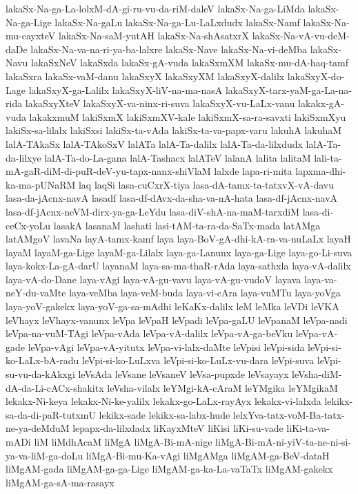 {lakaSx-Na-ga-La-lolxM-dA-gi-ru-vu-da-riM-daleV
lakaSx-Na-ga-LiMda
lakaSx-Na-ga-Lige
lakaSx-Na-gaLu
lakaSx-Na-ga-Lu-LaLxdudx
lakaSx-Namf
lakaSx-Na-mu-cayxteV
lakaSx-Na-saM-yutAH
lakaSx-Na-shAsatxrX
lakaSx-Na-vA-vu-deM-daDe
lakaSx-Na-va-na-ri-ya-ba-lalxre
lakaSx-Nave
lakaSx-Na-vi-deMba
lakaSx-Navu
lakaSxNeV
lakaSxda
lakaSx-gA-vuda
lakaSxmXM
lakaSx-mu-dA-haq-tamf
lakaSxra
lakaSx-vaM-danu
lakaSxyX
lakaSxyXM
lakaSxyX-dalilx
lakaSxyX-do-Lage
lakaSxyX-ga-Lalilx
lakaSxyX-liV-na-ma-nasA
lakaSxyX-tarx-yaM-ga-La-na-rida
lakaSxyXteV
lakaSxyX-va-ninx-ri-suva
lakaSxyX-vu-LaLx-vanu
lakakx-gA-vuda
lakakxmuM
lakiSxmX
lakiSxmXV-kale
lakiSxmX-sa-ra-savxti
lakiSxmXyu
lakiSx-sa-lilalx
lakiSxsi
lakiSx-ta-vAda
lakiSx-ta-va-papx-varu
lakuhA
lakuhaM
lalA-TAkaSx
lalA-TAkoSxV
lalATa
lalA-Ta-dalilx
lalA-Ta-da-lilxdudx
lalA-Ta-da-lilxye
lalA-Ta-do-La-gana
lalA-Tashacx
lalATeV
lalanA
lalita
lalitaM
lali-ta-mA-gaR-diM-di-puR-deV-yu-tapx-nanx-shiVlaM
lalxde
lapa-ri-mita
lapxma-dhi-ka-ma-pUNaRM
laq
laqSi
lasa-cuCxrX-tiya
lasa-dA-tamx-ta-tatxvX-vA-davu
lasa-da-jAcnx-navA
lasadf
lasa-df-dAvx-da-sha-va-nA-hata
lasa-df-jAcnx-navA
lasa-df-jAcnx-neVM-dirx-ya-ga-LeYdu
lasa-diV-shA-na-maM-tarxdiM
lasa-di-ceCx-yoLu
lasakA
lasanaM
lashati
lasi-tAM-ta-ra-da-SaTx-mada
latAMga
latAMgoV
lavaNa
layA-tamx-kamf
laya
laya-BoV-gA-dhi-kA-ra-va-nuLaLx
layaH
layaM
layaM-ga-Lige
layaM-ga-Lilalx
laya-ga-Lanunx
laya-ga-Lige
laya-go-Li-suva
laya-kokx-La-gA-darU
layanaM
laya-sa-ma-thaR-rAda
laya-sathxla
laya-vA-dalilx
laya-vA-do-Dane
laya-vAgi
laya-vA-gu-vavu
laya-vA-gu-vudoV
layava
laya-va-neY-du-vaMte
laya-veMba
laya-veM-buda
laya-vi-cAra
laya-vuMTu
laya-yoVga
laya-yoV-gakekx
laya-yoV-ga-sa-mAdhi
leKaKx-dalilx
leM
leMka
leVDi
leVKA
leVhayx
leVhayx-vanunx
leVpa
leVpaH
leVpadi
leVpa-gaLU
leVpanaM
leVpa-nadi
leVpa-na-vuM-TAgi
leVpa-vAda
leVpa-vA-dalilx
leVpa-vA-ga-beVku
leVpa-vA-gade
leVpa-vAgi
leVpa-vA-yitutx
leVpa-vi-lalx-daMte
leVpisi
leVpi-sida
leVpi-si-ko-LaLx-bA-radu
leVpi-si-ko-LuLxva
leVpi-si-ko-LuLx-vu-dara
leVpi-suva
leVpi-su-vu-da-kAkxgi
leVsAda
leVsane
leVsaneV
leVsa-pupxde
leVsayayx
leVsha-diM-dA-da-Li-cACx-shakitx
leVsha-vilalx
leYMgi-kA-cAraM
leYMgika
leYMgikaM
lekakx-Ni-keya
lekakx-Ni-ke-yalilx
lekakx-go-LaLx-rayAyx
lekakx-vi-lalxda
lekikx-sa-da-di-paR-tutxmU
lekikx-sade
lekikx-sa-labx-hude
lelxYva-tatx-voM-Ba-tatx-ne-ya-deMduM
lepapx-da-lilxdadx
liKayxMteV
liKisi
liKi-su-vade
liKi-ta-va-mADi
liM
liMdhAcaM
liMgA
liMgA-Bi-mA-nige
liMgA-Bi-mA-ni-yiV-ta-ne-ni-si-ya-va-liM-ga-doLu
liMgA-Bi-mu-Ka-vAgi
liMgAMga
liMgAM-ga-BeV-dataH
liMgAM-gada
liMgAM-ga-ga-Lige
liMgAM-ga-ka-La-vaTaTx
liMgAM-gakekx
liMgAM-ga-sA-ma-rasayx
}

